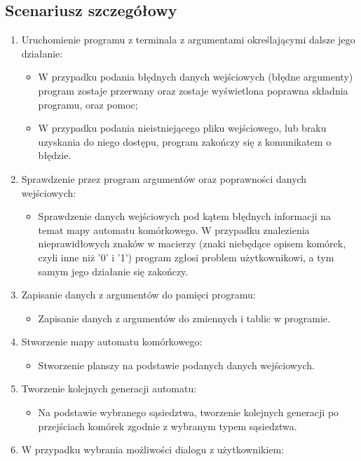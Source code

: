 \documentclass[a4paper,12pt]{article}
\begin{document}
\subsection{Scenariusz szczegółowy}
\begin{enumerate}
\item Uruchomienie programu z terminala z argumentami określającymi dalsze jego działanie:
	\begin{itemize}
	\item W przypadku podania błędnych danych wejściowych (błędne argumenty) program zostaje przerwany oraz zostaje wyświetlona poprawna składnia programu, oraz pomoc;
    \item W przypadku podania nieistniejącego pliku wejściowego, lub braku uzyskania do niego dostępu, program zakończy się z komunikatem o błędzie.
    \end{itemize}
\item Sprawdzenie przez program argumentów oraz poprawności danych wejściowych:
	\begin{itemize}
    \item Sprawdzenie danych wejściowych pod kątem błędnych informacji na temat mapy automatu komórkowego. W przypadku znalezienia nieprawidłowych znaków w macierzy (znaki niebędące opisem komórek, czyli inne niż '0' i '1') program zgłosi problem użytkownikowi, a tym samym jego działanie się zakończy.
    \end{itemize}
\item Zapisanie danych z argumentów do pamięci programu:
	\begin{itemize}
    \item Zapisanie danych z argumentów do zmiennych i tablic w programie.
    \end{itemize}
\item Stworzenie mapy automatu komórkowego:
	\begin{itemize}
    \item Stworzenie planszy na podstawie podanych danych wejściowych.
    \end{itemize}
\item Tworzenie kolejnych generacji automatu:
	\begin{itemize}
    \item Na podstawie wybranego sąsiedztwa, tworzenie kolejnych generacji po przejściach komórek zgodnie z wybranym typem sąsiedztwa.
    \end{itemize}
\item W przypadku wybrania możliwości dialogu z użytkownikiem:
	\begin{itemize}

\end{itemize}
\end{enumerate}
\end{document}
